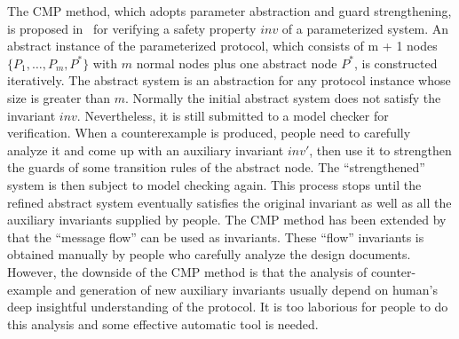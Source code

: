 \documentclass{llncs}
\newcommand{\bedt}[1]{{\color{black}#1}}
\begin{document}
The CMP method, which adopts parameter abstraction and guard strengthening, is proposed
in~\cite{Chou2004} for verifying a safety property $inv$ of
a parameterized system.
 An abstract instance of the parameterized protocol,  which consists of m + 1
nodes $\{P_1, \ldots , P_m, P^*\}$ with $m$ normal nodes plus one
abstract node $P^*$, is constructed iteratively. The abstract system is an
abstraction for any protocol instance whose size is greater than
$m$. Normally the initial abstract system does not satisfy the
invariant $inv$. Nevertheless, it is still submitted to a model
checker for verification. When a counterexample is produced, people need to
carefully analyze it and come up with an auxiliary invariant
$inv'$, then use it to strengthen the guards of some transition
rules of the abstract node. The ``strengthened'' system is then
subject to model checking again. This process stops until the
refined abstract system  eventually satisfies the original invariant
  as well as all the auxiliary invariants supplied by people. %
\bedt{The CMP method has been extended by \cite{Talupur2008a} that the ``message flow'' can be used as invariants. These ``flow'' invariants is obtained manually by people who carefully analyze the design documents.
 However, the downside of the CMP method is that the analysis of counter-example and generation of new auxiliary invariants usually
 depend on human's deep insightful understanding of the protocol.} It is too laborious for people to do this analysis and some effective automatic  tool is needed.%
\end{document}
